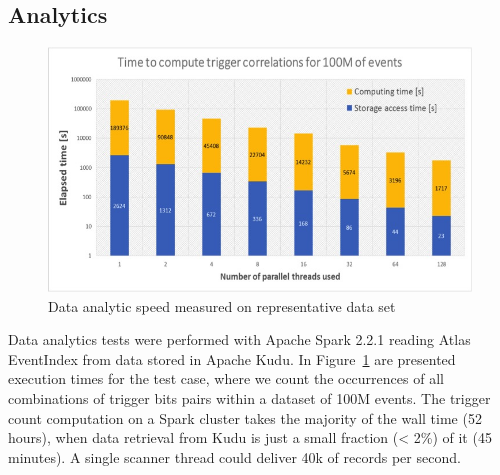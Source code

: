 \documentclass{webofc}
\begin{document}
\begin{linenumbers}
\subsection{Analytics}
\label{sec-6-an}
\begin{figure}
\centering
\includegraphics[width=\linewidth,clip]{analytics.jpg}
\caption{Data analytic speed measured on representative data set}
\label{fig:analytics}
\end{figure}
Data analytics tests were performed with Apache Spark 2.2.1 reading Atlas EventIndex from data stored in Apache Kudu.
In Figure~\ref{fig:analytics} are presented execution times for the test case, where we count the occurrences of all combinations of trigger bits pairs within a dataset of 100M events.
The trigger count computation on a Spark cluster takes the majority of the wall time (52 hours), when data retrieval from Kudu is just a small fraction (< 2\%) of it (45 minutes). A single scanner thread could deliver 40k of records per second.



\end{linenumbers}
\end{document}
